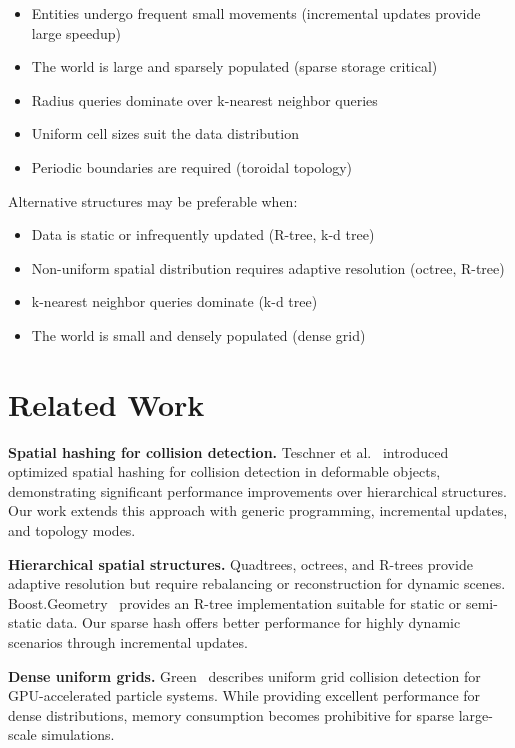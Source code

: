 \documentclass[11pt]{article}
\begin{document}
\begin{itemize}
\item Entities undergo frequent small movements (incremental updates provide large speedup)
\item The world is large and sparsely populated (sparse storage critical)
\item Radius queries dominate over k-nearest neighbor queries
\item Uniform cell sizes suit the data distribution
\item Periodic boundaries are required (toroidal topology)
\end{itemize}

Alternative structures may be preferable when:

\begin{itemize}
\item Data is static or infrequently updated (R-tree, k-d tree)
\item Non-uniform spatial distribution requires adaptive resolution (octree, R-tree)
\item k-nearest neighbor queries dominate (k-d tree)
\item The world is small and densely populated (dense grid)
\end{itemize}

\section{Related Work}

\textbf{Spatial hashing for collision detection.} Teschner et al.~\cite{teschner2003} introduced optimized spatial hashing for collision detection in deformable objects, demonstrating significant performance improvements over hierarchical structures. Our work extends this approach with generic programming, incremental updates, and topology modes.

\textbf{Hierarchical spatial structures.} Quadtrees, octrees, and R-trees provide adaptive resolution but require rebalancing or reconstruction for dynamic scenes. Boost.Geometry~\cite{boostgeometry} provides an R-tree implementation suitable for static or semi-static data. Our sparse hash offers better performance for highly dynamic scenarios through incremental updates.

\textbf{Dense uniform grids.} Green~\cite{green2008} describes uniform grid collision detection for GPU-accelerated particle systems. While providing excellent performance for dense distributions, memory consumption becomes prohibitive for sparse large-scale simulations.
\end{document}
